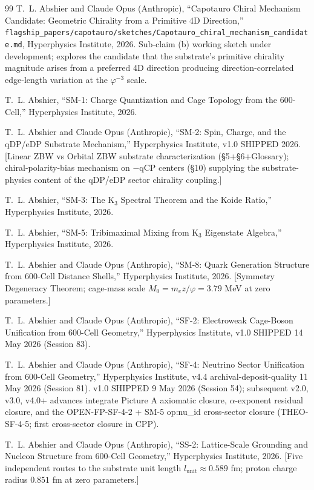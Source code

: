 \documentclass[11pt,letterpaper]{article}
\newcommand{\phig}{\varphi}
\begin{document}
\begin{thebibliography}{99}
 T.~L. Abshier and Claude Opus (Anthropic), ``Capotauro Chiral Mechanism Candidate: Geometric Chirality from a Primitive 4D Direction,'' \texttt{flagship\_papers/capotauro/sketches/Capotauro\_chiral\_mechanism\_candidate.md}, Hyperphysics Institute, 2026. Sub-claim (b) working sketch under development; explores the candidate that the substrate's primitive chirality magnitude arises from a preferred 4D direction producing direction-correlated edge-length variation at the $\phig^{-3}$ scale.

 T.~L. Abshier, ``SM-1: Charge Quantization and Cage Topology from the 600-Cell,'' Hyperphysics Institute, 2026.

 T.~L. Abshier and Claude Opus (Anthropic), ``SM-2: Spin, Charge, and the qDP/eDP Substrate Mechanism,'' Hyperphysics Institute, v1.0 SHIPPED 2026. [Linear ZBW vs Orbital ZBW substrate characterization (\S5+\S6+Glossary); chiral-polarity-bias mechanism on $-$qCP centers (\S10) supplying the substrate-physics content of the qDP/eDP sector chirality coupling.]

 T.~L. Abshier, ``SM-3: The K$_3$ Spectral Theorem and the Koide Ratio,'' Hyperphysics Institute, 2026.

 T.~L. Abshier, ``SM-5: Tribimaximal Mixing from K$_3$ Eigenstate Algebra,'' Hyperphysics Institute, 2026.

 T.~L. Abshier and Claude Opus (Anthropic), ``SM-8: Quark Generation Structure from 600-Cell Distance Shells,'' Hyperphysics Institute, 2026. [Symmetry Degeneracy Theorem; cage-mass scale $M_0 = m_e z/\phig = 3.79$ MeV at zero parameters.]

 T.~L. Abshier and Claude Opus (Anthropic), ``SF-2: Electroweak Cage-Boson Unification from 600-Cell Geometry,'' Hyperphysics Institute, v1.0 SHIPPED 14 May 2026 (Session 83).

 T.~L. Abshier and Claude Opus (Anthropic), ``SF-4: Neutrino Sector Unification from 600-Cell Geometry,'' Hyperphysics Institute, v4.4 archival-deposit-quality 11 May 2026 (Session 81). v1.0 SHIPPED 9 May 2026 (Session 54); subsequent v2.0, v3.0, v4.0+ advances integrate Picture A axiomatic closure, $\alpha$-exponent residual closure, and the OPEN-FP-SF-4-2 + SM-5 op:nu\_id cross-sector closure (THEO-SF-4-5; first cross-sector closure in CPP).

 T.~L. Abshier and Claude Opus (Anthropic), ``SS-2: Lattice-Scale Grounding and Nucleon Structure from 600-Cell Geometry,'' Hyperphysics Institute, 2026. [Five independent routes to the substrate unit length $l_\text{unit} \approx 0.589$ fm; proton charge radius $0.851$ fm at zero parameters.]


\end{thebibliography}
\end{document}
